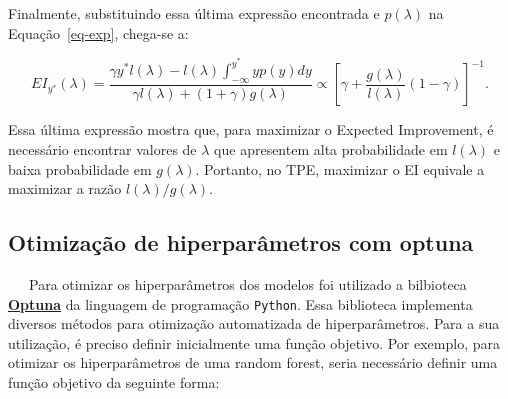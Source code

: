 \documentclass[
  12pt,
  a4paper,
]{scrreprt}
\begin{document}
Finalmente, substituindo essa última expressão encontrada e
\(p\left(\lambda\right)\) na Equação~\ref{eq-exp}, chega-se a:

\[
EI_{y^*}\left(\lambda\right) = \frac{\gamma y^* l\left(\lambda\right) - l\left(\lambda\right) \int_{-\infty}^{y^*} yp\left(y\right)dy}{\gamma l\left(\lambda\right) + \left(1 + \gamma\right)g\left(\lambda\right)} \propto \left[\gamma + \frac{g\left(\lambda\right)}{l\left(\lambda\right)} \left(1 - \gamma\right)\right]^{-1}\text{.}
\]

Essa última expressão mostra que, para maximizar o Expected Improvement,
é necessário encontrar valores de \(\lambda\) que apresentem alta
probabilidade em \(l\left(\lambda\right)\) e baixa probabilidade em
\(g\left(\lambda\right)\). Portanto, no TPE, maximizar o EI equivale a
maximizar a razão \(l\left(\lambda\right) / g\left(\lambda\right)\).

\subsection{Otimização de hiperparâmetros com
optuna}\label{otimizauxe7uxe3o-de-hiperparuxe2metros-com-optuna}

~~~Para otimizar os hiperparâmetros dos modelos foi utilizado a
bilbioteca \href{https://optuna.org/}{\textbf{Optuna}} da linguagem de
programação \texttt{Python}. Essa biblioteca implementa diversos métodos
para otimização automatizada de hiperparâmetros. Para a sua utilização,
é preciso definir inicialmente uma função objetivo. Por exemplo, para
otimizar os hiperparâmetros de uma random forest, seria necessário
definir uma função objetivo da seguinte forma:
\end{document}

